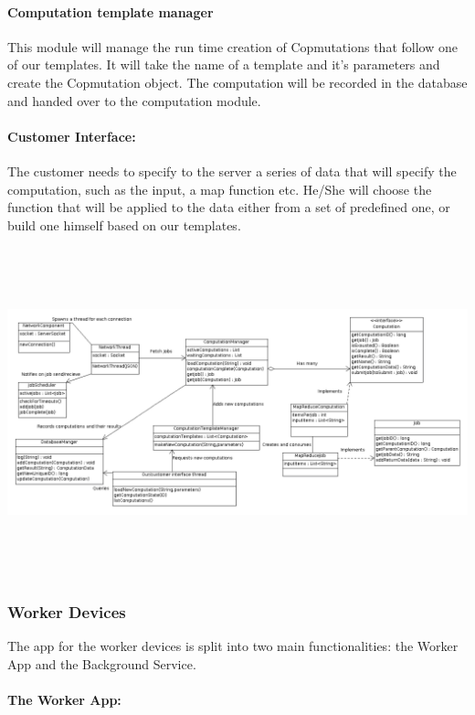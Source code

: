 \documentclass[a4paper,10pt]{article}
\begin{document}
\paragraph{Computation template manager}

This module will manage the run time creation of Copmutations that follow one of our templates. It will take the name of a template and it's parameters and create the Copmutation object.
The computation will be recorded in the database and handed over to the computation module.

\paragraph{Customer Interface:}

The customer needs to specify to the server a series of data that will specify the computation, such as the input, a map function etc. He/She will choose the function that will be applied to the data either from a set of predefined one, or build one himself based on our templates.

\hspace{-110pt}\includegraphics[height=270pt]{serveruml.png}

\subsubsection{Worker Devices}
The app for the worker devices is split into two main functionalities: the Worker App and the Background Service. 

\paragraph{The Worker App:}
\end{document}
